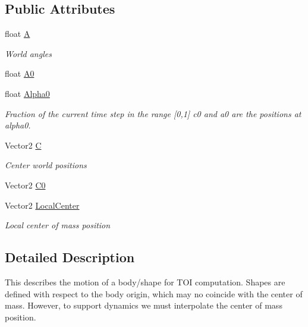 \subsection*{Public Attributes}
\begin{DoxyCompactItemize}
\item 
float \hyperlink{struct_farseer_physics_1_1_common_1_1_sweep_a71d00d22b7fc56184b00c92e4f3baa4b}{A}
\begin{DoxyCompactList}\small\item\em World angles \end{DoxyCompactList}\item 
float \hyperlink{struct_farseer_physics_1_1_common_1_1_sweep_a8ef1361d8782e8334bb9a59b2db99130}{A0}
\item 
float \hyperlink{struct_farseer_physics_1_1_common_1_1_sweep_a979d09b917c1b7be76852cc5328fe009}{Alpha0}
\begin{DoxyCompactList}\small\item\em Fraction of the current time step in the range \mbox{[}0,1\mbox{]} c0 and a0 are the positions at alpha0. \end{DoxyCompactList}\item 
Vector2 \hyperlink{struct_farseer_physics_1_1_common_1_1_sweep_a7caadbea6902042f9101cbd9801be4f6}{C}
\begin{DoxyCompactList}\small\item\em Center world positions \end{DoxyCompactList}\item 
Vector2 \hyperlink{struct_farseer_physics_1_1_common_1_1_sweep_ad87be96d9955ee6c1b096820218d5abe}{C0}
\item 
Vector2 \hyperlink{struct_farseer_physics_1_1_common_1_1_sweep_aee5495c8f6ce3ded48b6e0b812dac58b}{Local\+Center}
\begin{DoxyCompactList}\small\item\em Local center of mass position \end{DoxyCompactList}\end{DoxyCompactItemize}


\subsection{Detailed Description}
This describes the motion of a body/shape for T\+O\+I computation. Shapes are defined with respect to the body origin, which may no coincide with the center of mass. However, to support dynamics we must interpolate the center of mass position. 



